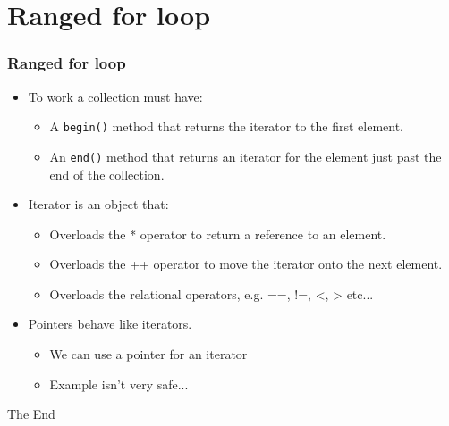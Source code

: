 \documentclass{beamer}
\begin{document}
\section{Ranged for loop}
\begin{frame}[allowframebreaks]
\frametitle{Ranged for loop}
\begin{itemize}
\item To work a collection must have:
\begin{itemize}
\item A \texttt{begin()} method that returns the iterator to the first element.
\item An \texttt{end()} method that returns an iterator for the element just past the end of the collection.
\end{itemize}
\item Iterator is an object that:
\begin{itemize}
\item Overloads the * operator to return a reference to an element.
\item Overloads the ++ operator to move the iterator onto the next element.
\item Overloads the relational operators, e.g. ==, !=, <, > etc...
\end{itemize}
\item Pointers behave like iterators.
\begin{itemize}
\item We can use a pointer for an iterator
\item Example isn't very safe...
\end{itemize}
\end{itemize}
\for
\end{frame}

\begin{frame} 
\Huge{\centerline{The End}}
\end{frame}
\end{document}
